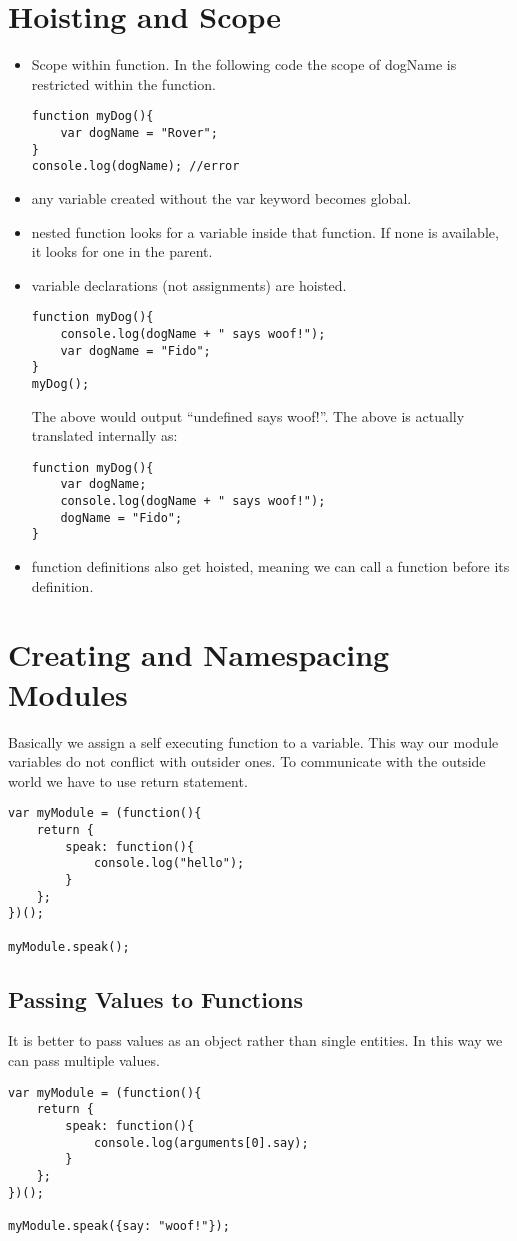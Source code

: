 \documentclass[12pt, a4paper]{article}
\begin{document}
\section{Hoisting and Scope}
\begin{itemize}
\item Scope within function. In the following code the scope of dogName is restricted within the function.
\begin{verbatim}
function myDog(){
    var dogName = "Rover";  
}
console.log(dogName); //error
\end{verbatim}
\item any variable created without the var keyword becomes global.
\item nested function looks for a variable inside that function. If none is available, it looks for one in the parent.
\item variable declarations (not assignments) are hoisted.
\begin{verbatim}
function myDog(){
    console.log(dogName + " says woof!");
    var dogName = "Fido";   
}
myDog();
\end{verbatim}
The above would output ``undefined says woof!''. The above is actually translated internally as:
\begin{verbatim}
function myDog(){
    var dogName;
    console.log(dogName + " says woof!");
    dogName = "Fido";   
}
\end{verbatim}
\item function definitions also get hoisted, meaning we can call a function before its definition.
\end{itemize}

\section{Creating and Namespacing Modules}
Basically we assign a self executing function to a variable.
This way our module variables do not conflict with outsider ones.
To communicate with the outside world we have to use return statement.
\begin{verbatim}
var myModule = (function(){
    return {
        speak: function(){
            console.log("hello");
        }
    };  
})();

myModule.speak();
\end{verbatim}
\subsection{Passing Values to Functions}
It is better to pass values as an object rather than single entities.
In this way we can pass multiple values.
\begin{verbatim}
var myModule = (function(){
    return {
        speak: function(){
            console.log(arguments[0].say);
        }
    };
})();

myModule.speak({say: "woof!"});
\end{verbatim}
\end{document}
